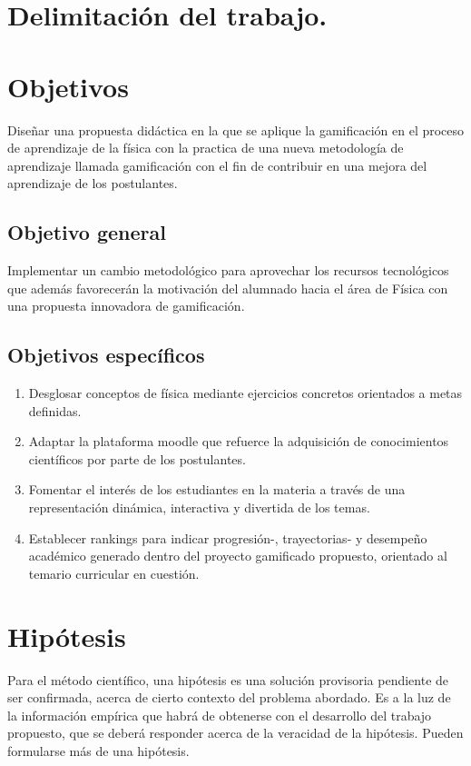 \documentclass[12pt,a4paper]{article}
\begin{document}
\section{Delimitación del trabajo.}


\section{Objetivos}
Diseñar una propuesta didáctica en la que se aplique la gamificación en el proceso de aprendizaje de la física con la practica de una nueva metodología de aprendizaje llamada gamificación con el fin de contribuir en una mejora del aprendizaje de los postulantes.

\subsection{Objetivo general}
Implementar un cambio metodológico para aprovechar los recursos tecnológicos que además favorecerán la motivación del alumnado hacia el área de Física con una propuesta innovadora de gamificación.
 
\subsection{Objetivos específicos}

\begin{enumerate}
\item Desglosar conceptos de física mediante ejercicios concretos orientados a metas definidas.
\item Adaptar la plataforma moodle que refuerce la adquisición de conocimientos científicos por parte de los postulantes.
\item Fomentar el interés de los estudiantes en la materia a través de una representación dinámica, interactiva y divertida de los temas.
\item Establecer rankings para indicar progresión-, trayectorias- y desempeño académico generado dentro del proyecto gamificado propuesto, orientado al temario curricular en cuestión.\\


\end{enumerate}

\section{Hipótesis}
Para el método científico, una hipótesis es una solución provisoria pendiente de ser confirmada, acerca de cierto contexto del problema abordado. Es a la luz de la información empírica que habrá de obtenerse con el desarrollo del trabajo propuesto, que se deberá responder acerca de la veracidad de la hipótesis. Pueden formularse más de una hipótesis.
\end{document}
